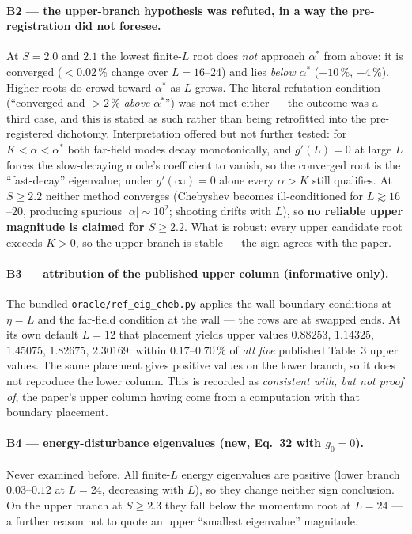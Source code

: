 \documentclass[11pt,a4paper]{article}
\newcommand{\code}[1]{\texttt{\small #1}}
\newcommand{\pct}{\,\%}
\begin{document}
\paragraph{B2 --- the upper-branch hypothesis was refuted, in a way the pre-registration did
not foresee.} At $S{=}2.0$ and $2.1$ the lowest finite-$L$ root does \emph{not} approach
$\alpha^{*}$ from above: it is converged ($<0.02\pct$ change over $L{=}16$--$24$) and lies
\emph{below} $\alpha^{*}$ ($-10\pct$, $-4\pct$). Higher roots do crowd toward $\alpha^{*}$ as
$L$ grows. The literal refutation condition (``converged and $>2\pct$ \emph{above}
$\alpha^{*}$'') was not met either --- the outcome was a third case, and this is stated as
such rather than being retrofitted into the pre-registered dichotomy. Interpretation offered
but not further tested: for $K<\alpha<\alpha^{*}$ both far-field modes decay monotonically,
and $g'(L)=0$ at large $L$ forces the slow-decaying mode's coefficient to vanish, so the
converged root is the ``fast-decay'' eigenvalue; under $g'(\infty)=0$ alone every
$\alpha>K$ still qualifies. At $S\geq2.2$ neither method converges (Chebyshev becomes
ill-conditioned for $L\gtrsim16$--$20$, producing spurious $|\alpha|\sim10^{2}$; shooting
drifts with $L$), so \textbf{no reliable upper magnitude is claimed for $S\geq2.2$}. What is
robust: every upper candidate root exceeds $K>0$, so the upper branch is stable --- the sign
agrees with the paper.

\paragraph{B3 --- attribution of the published upper column (informative only).} The bundled
\code{oracle/ref\_eig\_cheb.py} applies the wall boundary conditions at $\eta=L$ and the
far-field condition at the wall --- the rows are at swapped ends. At its own default
$L{=}12$ that placement yields upper values $0.88253$, $1.14325$, $1.45075$, $1.82675$,
$2.30169$: within $0.17$--$0.70\pct$ of \emph{all five} published Table~3 upper values. The
same placement gives positive values on the lower branch, so it does not reproduce the lower
column. This is recorded as \emph{consistent with, but not proof of}, the paper's upper
column having come from a computation with that boundary placement.

\paragraph{B4 --- energy-disturbance eigenvalues (new, Eq.~32 with $g_0=0$).} Never examined
before. All finite-$L$ energy eigenvalues are positive (lower branch $0.03$--$0.12$ at
$L{=}24$, decreasing with $L$), so they change neither sign conclusion. On the upper branch
at $S\geq2.3$ they fall below the momentum root at $L{=}24$ --- a further reason not to quote
an upper ``smallest eigenvalue'' magnitude.
\end{document}
